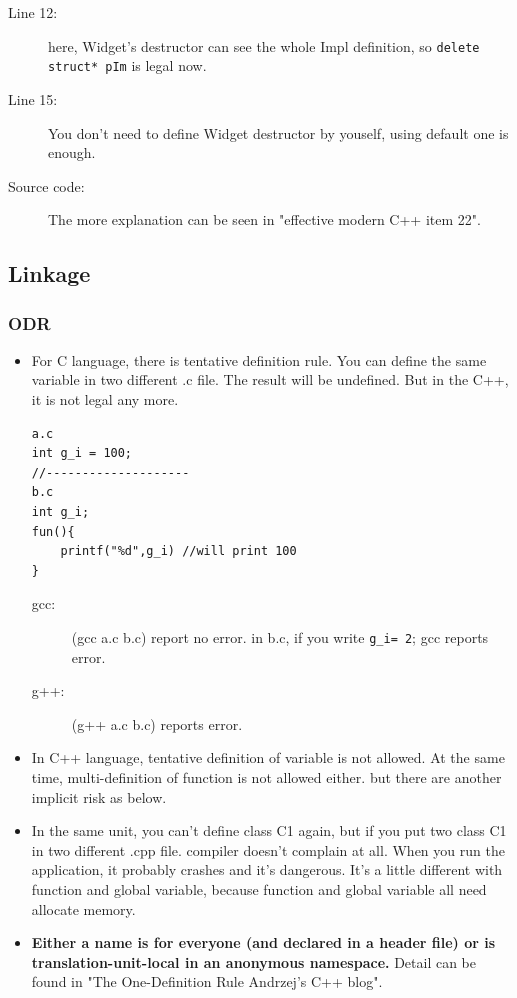 \documentclass[a4paper,11pt,twoside]{book}
\begin{document}
\begin{itemize}
\begin{enumerate}
\begin{description}
	\item[Line 12:]here, Widget's destructor can see the whole Impl definition, so \texttt{delete struct* pIm} is legal now.
	
	\item[Line 15:]You don't need to define Widget destructor by youself, using default one is enough.
	
	\item[Source code:] The more explanation can be seen in "effective modern C++ item 22". 
\end{description}

\end{enumerate}
\end{itemize}

\subsection{Linkage}

\subsubsection{ODR}
\begin{itemize}
	\item For C language, there is tentative definition rule. You can define the same variable in two different .c file. The result will be undefined. But in the C++, it is not legal any more. 
	
\begin{lstlisting}[numbers=none]
a.c
int g_i = 100;
//--------------------
b.c
int g_i;
fun(){
	printf("%d",g_i) //will print 100
}
\end{lstlisting}
	\begin{description}
		\item[gcc:] (gcc a.c b.c) report no error. in b.c, if you write \texttt{g\_i= 2}; gcc reports error.
		\item[g++:] (g++ a.c b.c) reports error.
	\end{description}

	\item In C++ language, tentative definition of variable is not allowed. At the same time, multi-definition of function is not allowed either. but there are another implicit risk as below. 
	
	\item In the same unit, you can't define class C1 again, but if you put two class C1 in two different .cpp file. compiler doesn't complain at all. When you run the application, it probably crashes and it's dangerous. It's a little different with function and global variable, because function and global variable all need allocate memory.
	
	\item \textbf{Either a name is for everyone (and declared in a header file) or is translation-unit-local in an anonymous namespace.} Detail can be found in "The One-Definition Rule  Andrzej's C++ blog".
\end{itemize}
\end{document}
